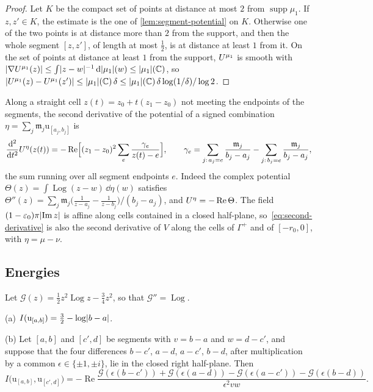 \begin{proof}
Let $K$ be the compact set of points at distance at most $2$ from $\operatorname{supp}\mu_1$. If
$z,z'\in K$, the estimate is the one of \cref{lem:segment-potential} on $K$. Otherwise one of the
two points is at distance more than $2$ from the support, and then the whole segment $[z,z']$, of
length at most $\frac12$, is at distance at least $1$ from it. On the set of points at distance
at least $1$ from the support, $U^{\mu_1}$ is smooth with
$\lvert \nabla U^{\mu_1}(z)\rvert\le\int\lvert z-w\rvert^{-1}\,\mathrm{d}\lvert \mu_1\rvert(w)\le\lvert \mu_1\rvert(\mathbb{C})$, so
$\lvert U^{\mu_1}(z)-U^{\mu_1}(z')\rvert\le\lvert \mu_1\rvert(\mathbb{C})\,\delta\le\lvert \mu_1\rvert(\mathbb{C})\,\delta\log(1/\delta)/\log2$.
\end{proof}

Along a straight cell $z(t)=z_0+t(z_1-z_0)$ not meeting the endpoints of the segments, the second
derivative of the potential of a signed combination $\eta=\sum_j\mathfrak m_j\mathrm u_{[a_j,b_j]}$ is
\begin{equation}\label{eq:second-derivative}
  \frac{\mathrm{d}^2}{\mathrm{d} t^2}U^{\eta}(z(t))=-\operatorname{Re}\Bigl[(z_1-z_0)^2\sum_{e}\frac{\gamma_e}{z(t)-e}\Bigr],
  \qquad\gamma_e=\sum_{j:\,a_j=e}\frac{\mathfrak m_j}{b_j-a_j}-\sum_{j:\,b_j=e}\frac{\mathfrak m_j}{b_j-a_j},
\end{equation}
the sum running over all segment endpoints $e$. Indeed the complex potential
$\Theta(z)=\int\operatorname{Log}(z-w)\,\dd\eta(w)$ satisfies
$\Theta''(z)=\sum_j\mathfrak m_j\bigl(\frac1{z-a_j}-\frac1{z-b_j}\bigr)/(b_j-a_j)$, and
$U^{\eta}=-\operatorname{Re}\Theta$. The field $(1-\varepsilon_0)\pi\lvert \operatorname{Im}z\rvert$ is affine
along cells contained in a closed half-plane, so~\eqref{eq:second-derivative} is also the second
derivative of $V$ along the cells of $\Gamma^+$ and of $[-r_0,0]$, with $\eta=\mu-\nu$.

\subsection{Energies}\label{subsec:energy-formulas}

Let $\mathcal G(z)=\frac12z^2\operatorname{Log}z-\frac34z^2$, so that $\mathcal G''=\operatorname{Log}$.

\begin{lemma}\label{lem:segment-energies}
(a) $I(\mathrm u_{[a,b]})=\frac32-\log\lvert b-a\rvert$.

(b) Let $[a,b]$ and $[c',d]$ be segments with $v=b-a$ and $w=d-c'$, and suppose that the four
differences $b-c'$, $a-d$, $a-c'$, $b-d$, after multiplication by a common $\epsilon\in\{\pm1,\pm i\}$,
lie in the closed right half-plane. Then
\[
  I\bigl(\mathrm u_{[a,b]},\mathrm u_{[c',d]}\bigr)
  =-\operatorname{Re}\frac{\mathcal G(\epsilon(b-c'))+\mathcal G(\epsilon(a-d))-\mathcal G(\epsilon(a-c'))-\mathcal G(\epsilon(b-d))}{\epsilon^2vw}.
\]
\end{lemma}

